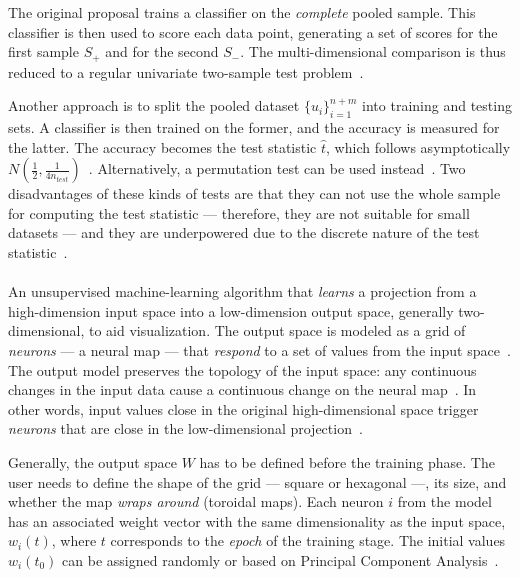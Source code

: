 The original proposal trains a classifier on the \emph{complete} pooled sample.
This classifier is then used to score each data point, generating a set of scores
for the first sample $S_+$ and for the second $S_-$. The multi-dimensional comparison
is thus reduced to a regular univariate two-sample test problem~\cite{friedman2004multivariate}.

Another approach is to split the pooled dataset $\{u_i\}_{i=1}^{n+m}$ into training
and testing sets. A classifier is then trained on the former, and the accuracy is
measured for the latter. The accuracy becomes the test statistic $\hat t$, which
follows asymptotically $N(\frac{1}{2}, \frac{1}{4 n_{test}})$~\cite{lopez2016revisiting}.
Alternatively, a permutation test can be used  instead~\cite{kim2021classification}.
Two disadvantages of these kinds of tests are that they can not use the whole sample
for computing the test statistic --- therefore, they are not suitable for small
datasets --- and they are underpowered due to the discrete nature of the test
statistic~\cite{rosenblatt2021better}.

\paragraph{}
An unsupervised machine-learning algorithm that \emph{learns}
a projection from a high-dimension input space into a low-dimension output space,
generally two-dimensional, to aid visualization.
The output space is modeled as a grid of \emph{neurons} --- a neural map ---
that \emph{respond} to a set of values from the input space~\cite{kohonen1982self}.
The output model preserves the topology of the input space: any continuous changes
in the input data cause a continuous change on the neural map~\cite{Villmann1999}.
In other words, input values close in the original high-dimensional space
trigger \emph{neurons} that are close in the low-dimensional projection~\cite{KOHONEN201352}.

Generally, the output space $W$ has to be defined before the training phase.
The user needs to define the shape of the grid --- square or hexagonal ---,
its size, and whether the map \emph{wraps around} (toroidal maps).
Each neuron $i$ from the model has an associated weight vector with the same
dimensionality as the input space, $w_{i}(t)$, where $t$ corresponds to the
\emph{epoch} of the training stage.
The initial values $w_i(t_0)$ can be assigned randomly or based on
Principal Component Analysis~\cite{KOHONEN201352}.

